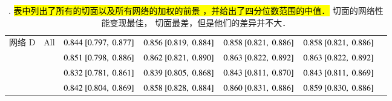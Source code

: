 \begin{sidewaystable*}
\begin{center}
\begin{tabular}{ccccccc}
\midrule
网络 D & All    & $0.844~[0.797,~0.877]$ & $0.856~[0.819,~0.884]$ & $0.858~[0.821,~0.886]$ & $0.858~[0.821,~0.886]$ \\
          & \SA{}  & $0.851~[0.798,~0.886]$ & $0.862~[0.821,~0.890]$ & $0.863~[0.822,~0.892]$ & $0.863~[0.822,~0.892]$ \\
          & \HLA{} & $0.832~[0.781,~0.861]$ & $0.839~[0.805,~0.868]$ & $0.843~[0.811,~0.870]$ & $0.843~[0.811,~0.869]$ \\
          & \VLA{} & $0.842~[0.804,~0.869]$ & $0.858~[0.828,~0.884]$ & $0.860~[0.831,~0.886]$ & $0.859~[0.830,~0.886]$ \\
\bottomrule
\end{tabular}
\caption[\captiontitle{}]{\captiontitle{}.
\hl{
表中列出了所有的切面以及所有网络的加权的前景 \IoU{}，并给出了四分位数范围的中值．
}
\SA{} 切面的网络性能变现最佳，\HLA{} 切面最差，但是他们的差异并不大．
}
\label{tab:architectureaccuracy}
\end{center}
\end{sidewaystable*}
